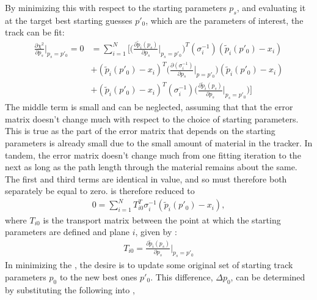 By minimizing this \chisq with respect to the starting parameters $p_{s}$, and evaluating it at the target best starting guesses $p'_{0}$, which are the parameters of interest, the track can be fit:
    \begin{equation}
    \begin{aligned}
        \frac{\partial \chi^{2}}{\partial p_{s}}\Big|_{p_{s}=p'_{0}} = 0 
            &= \sum_{i=1}^{N}\Big[ \Big(\frac{\partial \widetilde{p}_{i}(p_{s})}{\partial p_{s}}\Big|_{p_{s}=p'_{0}}\Big)^{T} (\sigma_{i}^{-1}) (\widetilde{p}_{i}(p'_{0})-x_{i}) \\ 
            &+ (\widetilde{p}_{i}(p'_{0})-x_{i})^{T} \Big(\frac{\partial(\sigma_{i}^{-1})}{\partial p_{s}}\Big|_{p=p'_{0}}\Big) (\widetilde{p}_{i}(p'_{0})-x_{i}) \\ 
            &+  (\widetilde{p}_{i}(p'_{0})-x_{i})^{T} (\sigma_{i}^{-1}) \Big(\frac{\partial \widetilde{p}_{i}(p_{s})}{\partial p_{s}}\Big|_{p_{s}=p'_{0}}\Big)\Big]
    \label{eq:chi2summinimize}
    \end{aligned}
    \end{equation}
The middle term is small and can be neglected, assuming that that the error matrix doesn't change much with respect to the choice of starting parameters. This is true as the part of the error matrix that depends on the starting parameters is already small due to the small amount of material in the tracker. In tandem, the error matrix doesn't change much from one fitting iteration to the next as long as the path length through the material remains about the same. The first and third terms are identical in value, and so must therefore both separately be equal to zero.  is therefore reduced to 
    \begin{align} \label{eq:chi2sumreduced}
        0 = \sum_{i=1}^{N} T^{T}_{i0} \sigma_{i}^{-1} (\widetilde{p}_{i}(p'_{0})-x_{i}),
    \end{align}
where $T_{i0}$ is the transport matrix between the point at which the starting parameters are defined and plane $i$, given by :
    \begin{align} \label{eq:transportfrom0}
         T_{i0} = \frac{\partial \widetilde{p}_{i}(p_{s})}{\partial p_{s}}\Big|_{p_{s}=p'_{0}}
    \end{align}
In minimizing the \chisq, the desire is to update some original set of starting track parameters $p_{0}$ to the new best ones $p'_{0}$. This difference, $\Delta p_{0}$, can be determined by substituting the following into ,
